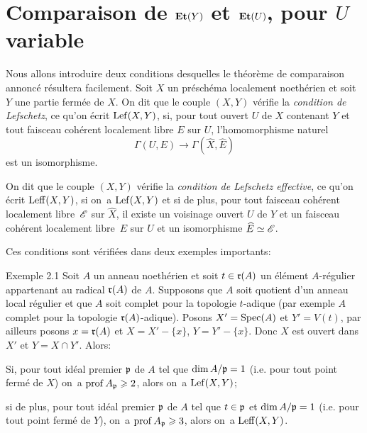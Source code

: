 \section{Comparaison de $\mathbf{Et}(Y)$ et $\mathbf{Et}(U)$, pour $U$ variable} \label{X.2}

Nous allons introduire deux conditions desquelles le th\'eor\`eme de comparaison annonc\'e r\'esultera facilement. Soit $X$ un pr\'esch\'ema localement noeth\'erien et soit $Y$ une partie ferm\'ee de $X$. On dit que le couple $(X, Y)$ v\'erifie la \emph{condition de Lefschetz}, ce qu'on \'ecrit $\operatorname{Lef}(X, Y)$,\label{pX.2} si, pour tout ouvert $U$ de $X$ contenant $Y$ et tout faisceau coh\'erent localement libre $E$ sur $U$, l'homomorphisme naturel
\[
\Gamma(U, E) \to \Gamma(\hat{X}, \hat{E})
\]
est un isomorphisme.

On dit que le couple $(X, Y)$ v\'erifie la \emph{condition de Lefschetz effective}, ce qu'on \'ecrit $\operatorname{Leff}(X, Y)$, si on~a $\operatorname{Lef}(X, Y)$ et si de plus, pour tout faisceau coh\'erent localement libre~${\mathscr E}$ sur $\hat{X}$, il existe un voisinage ouvert $U$ de $Y$ et un faisceau coh\'erent localement libre~$E$ sur $U$ et un isomorphisme $\widehat{E}\simeq{\mathscr E}$.

Ces conditions sont v\'erifi\'ees dans deux exemples importants:

\label{X.2.1}
\begin{enonce*}[remark]{Exemple 2.1\ndemark}
 Soit $A$ un anneau noeth\'erien et soit $t\in \mathfrak{r}(A)$ un \'el\'ement $A$-r\'egulier appartenant au radical $\mathfrak{r}(A)$ de $A$. Supposons que $A$ soit quotient d'un anneau local r\'egulier et que $A$ soit complet pour la topologie $t$-adique (par exemple $A$ complet pour la topologie $\mathfrak{r}(A)$-adique). Posons $X'=\operatorname{Spec}(A)$ et $Y'=V(t)$, par ailleurs posons $x=\mathfrak{r}(A)$ et $X=X'-\{x\}$, $Y=Y'-\{x\}$. Donc $X$ est ouvert dans $X'$ et $Y=X\cap Y'$. Alors:
\begin{enumeratei}
\item
Si, pour tout id\'eal premier $\mathfrak{p}$ de $A$ tel que $\dim A/\mathfrak{p}=1$ (i.e. pour tout point ferm\'e de $X$) on~a $\operatorname{prof} A_{\mathfrak{p}}\geqslant 2$, alors on~a $\operatorname{Lef}(X, Y)$;

\item
si de plus, pour tout id\'eal premier $\mathfrak{p}$ de $A$ tel que $t\in\mathfrak{p}$ et $\dim A/\mathfrak{p}=1$ (i.e. pour tout point ferm\'e de $Y$), on~a $\operatorname{prof} A_{\mathfrak{p}}\geqslant 3$, alors on~a $\operatorname{Leff}(X, Y)$.
\end{enumeratei}
\end{enonce*}

